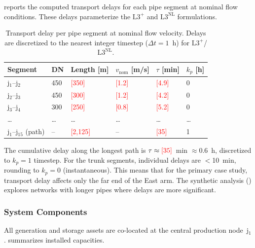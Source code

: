 \documentclass[review,3p]{elsarticle}
\newcommand{\placeholder}[1]{\textcolor{red}{[#1]}}
\newcommand{\Lplus}{\mathrm{L3}^{+}}
\newcommand{\Lnl}{\mathrm{L3}^{\mathrm{NL}}}
\begin{document}
 reports the computed transport delays
for each pipe segment at nominal flow conditions. These delays
parameterize the $\Lplus$ and $\Lnl$ formulations.

\begin{table}[htbp]
\centering
\caption{Transport delay per pipe segment at nominal flow velocity.
Delays are discretized to the nearest integer timestep
($\Delta t = 1$~h) for $\Lplus$/$\Lnl$.}
\label{tab:transport_delays}
\small
\begin{tabular}{@{}llllll@{}}
\toprule
Segment & DN & Length [m] & $v_{\mathrm{nom}}$ [m/s]
  & $\tau$ [min] & $k_p$ [h] \\
\midrule
j$_1$--j$_2$ & 450 & \placeholder{350}
  & \placeholder{1.2} & \placeholder{4.9} & 0 \\
j$_2$--j$_3$ & 450 & \placeholder{300}
  & \placeholder{1.2} & \placeholder{4.2} & 0 \\
j$_3$--j$_4$ & 300 & \placeholder{250}
  & \placeholder{0.8} & \placeholder{5.2} & 0 \\
\ldots & \ldots & \ldots & \ldots & \ldots & \ldots \\
j$_1$--j$_{15}$ (path) & -- & \placeholder{2,125}
  & -- & \placeholder{35} & 1 \\
\bottomrule
\end{tabular}
\end{table}

The cumulative delay along the longest path is
$\tau \approx \placeholder{35}$~min $\approx 0.6$~h, discretized
to $k_p = 1$ timestep. For the trunk segments, individual delays
are $<$10~min, rounding to $k_p = 0$ (instantaneous). This means
that for the primary case study, transport delay affects only the
far end of the East arm. The synthetic analysis
() explores networks with
longer pipes where delays are more significant.

\subsubsection{System Components}
\label{sec:case_components}

All generation and storage assets are co-located at the central
production node~j$_1$.  summarizes installed
capacities.
\end{document}
